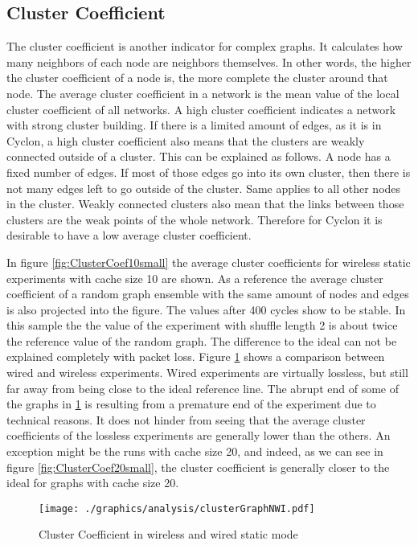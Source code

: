 \subsection{Cluster Coefficient}
The cluster coefficient is another indicator for complex graphs. It
calculates how many neighbors of each node are neighbors themselves. In other
words, the higher the cluster coefficient of a node is, the more complete the
cluster around that node. The average cluster coefficient in a network is the
mean value of the local cluster coefficient of all networks. A high cluster
coefficient indicates a network with strong cluster building. If there is a
limited amount of edges, as it is in Cyclon, a high cluster coefficient also
means that the clusters are weakly connected outside of a cluster. This can be
explained as follows. A node has a fixed number of edges. If most of those edges
go into its own cluster, then there is not many edges left to go outside of the
cluster. Same applies to all other nodes in the cluster. Weakly connected
clusters also mean that the links between those clusters are the weak points of
the whole network. Therefore for Cyclon it is desirable to have a low
average cluster coefficient.

In figure \ref{fig:ClusterCoef10small} the average
cluster coefficients for wireless static experiments with cache size 10 are
shown. As a reference the average cluster coefficient of a random graph ensemble
with the same amount of nodes and edges is also projected into the figure. The
values after 400 cycles show to be stable. In this sample the the value of the
experiment with shuffle length 2 is about twice the reference value of the
random graph. The difference to the ideal can not be explained completely with
packet loss. Figure \ref{fig:ClusterCoefNWI} shows a comparison between
wired and wireless experiments. Wired experiments are virtually lossless, but
still far away from being close to the ideal reference line. The abrupt end
of some of the graphs in \ref{fig:ClusterCoefNWI} is resulting from a premature
end of the experiment due to technical reasons. It does not hinder from seeing
that the average cluster coefficients of the lossless experiments are generally
lower than the others. An exception might be the runs with cache size 20, and
indeed, as we can see in figure \ref{fig:ClusterCoef20small}, the cluster
coefficient is generally closer to the ideal for graphs with cache size 20.

\begin{figure}
	\centering
	\texttt{[image: ./graphics/analysis/clusterGraphNWI.pdf]}
	\caption{Cluster Coefficient in wireless and wired static mode}
	\label{fig:ClusterCoefNWI}
\end{figure}

